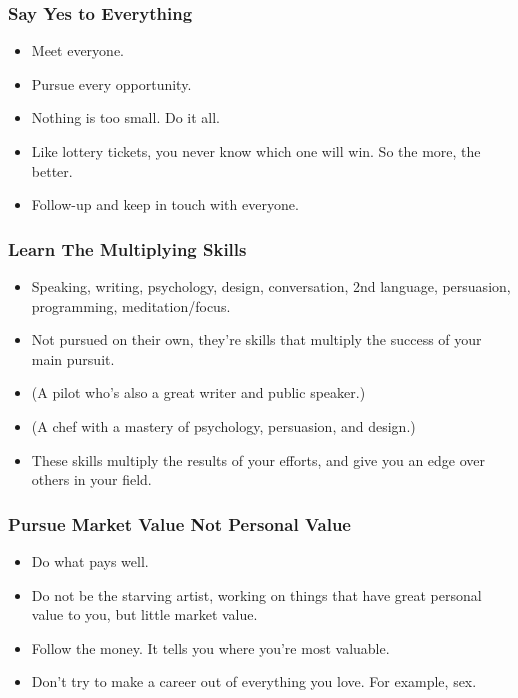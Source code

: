 \begin{frame}[fragile]\frametitle{Say Yes to Everything}

\begin{itemize}
\item Meet everyone.
\item Pursue every opportunity.
\item Nothing is too small. Do it all.
\item Like lottery tickets, you never know which one will win. So the more, the better.
\item Follow-up and keep in touch with everyone.
\end{itemize}

\end{frame}

\begin{frame}[fragile]\frametitle{Learn The Multiplying Skills}

\begin{itemize}
\item Speaking, writing, psychology, design, conversation, 2nd language, persuasion, programming, meditation/focus.
\item Not pursued on their own, they’re skills that multiply the success of your main pursuit.
\item (A pilot who’s also a great writer and public speaker.)
\item (A chef with a mastery of psychology, persuasion, and design.)
\item These skills multiply the results of your efforts, and give you an edge over others in your field.
\end{itemize}

\end{frame}

\begin{frame}[fragile]\frametitle{Pursue Market Value Not Personal Value}

\begin{itemize}
\item Do what pays well.
\item Do not be the starving artist, working on things that have great personal value to you, but little market value.
\item Follow the money. It tells you where you’re most valuable.
\item Don’t try to make a career out of everything you love. For example, sex.
\end{itemize}

\end{frame}

